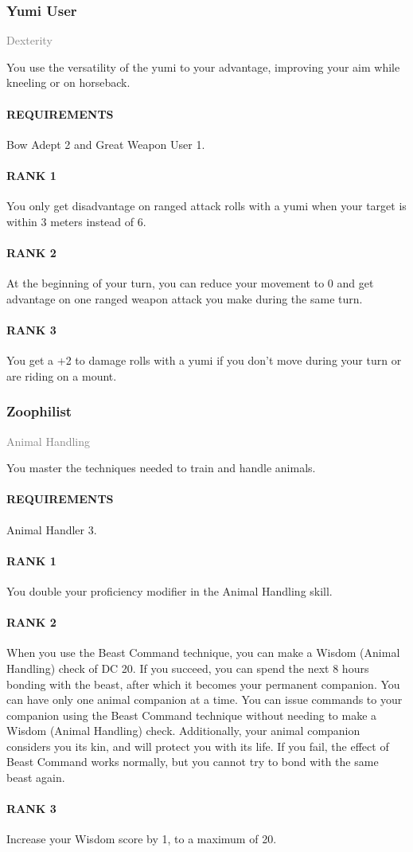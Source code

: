 \subsubsection{Yumi User} \label{tal::yumiuser}
\small{\textcolor{gray}{Dexterity}}

\normalsize
You use the versatility of the yumi to your advantage, improving your aim while kneeling or on horseback.
\paragraph{REQUIREMENTS} Bow Adept 2 and Great Weapon User 1.
\paragraph{RANK 1} You only get disadvantage on ranged attack rolls with a yumi when your target is within 3 meters instead of 6.
\paragraph{RANK 2} At the beginning of your turn, you can reduce your movement to 0 and get advantage on one ranged weapon attack you make during the same turn.
\paragraph{RANK 3} You get a +2 to damage rolls with a yumi if you don't move during your turn or are riding on a mount.

\subsubsection{Zoophilist} \label{tal::zoophilist}
\small{\textcolor{gray}{Animal Handling}}

\normalsize
You master the techniques needed to train and handle animals.
\paragraph{REQUIREMENTS} Animal Handler 3.
\paragraph{RANK 1} You double your proficiency modifier in the Animal Handling skill.
\paragraph{RANK 2} When you use the Beast Command technique, you can make a Wisdom (Animal Handling) check of DC 20.
If you succeed, you can spend the next 8 hours bonding with the beast, after which it becomes your permanent companion.
You can have only one animal companion at a time.
You can issue commands to your companion using the Beast Command technique without needing to make a Wisdom (Animal Handling) check.
Additionally, your animal companion considers you its kin, and will protect you with its life.
If you fail, the effect of Beast Command works normally, but you cannot try to bond with the same beast again.
\paragraph{RANK 3} Increase your Wisdom score by 1, to a maximum of 20.

